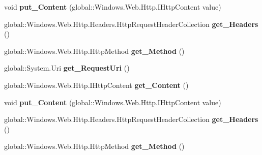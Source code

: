 \begin{DoxyCompactItemize}
void {\bfseries put\+\_\+\+Content} (global\+::\+Windows.\+Web.\+Http.\+I\+Http\+Content value)
\item 
\mbox{\label{interface_windows_1_1_web_1_1_http_1_1_i_http_request_message_a673256b5835bfd09b1edd689fb5333ad}} 
global\+::\+Windows.\+Web.\+Http.\+Headers.\+Http\+Request\+Header\+Collection {\bfseries get\+\_\+\+Headers} ()
\item 
\mbox{\label{interface_windows_1_1_web_1_1_http_1_1_i_http_request_message_a91a5d1f2da9e595f9d1b6c72e674d3dc}} 
global\+::\+Windows.\+Web.\+Http.\+Http\+Method {\bfseries get\+\_\+\+Method} ()
\item 
\mbox{\label{interface_windows_1_1_web_1_1_http_1_1_i_http_request_message_ace91874a34280b89ed6f4237fc3806df}} 
global\+::\+System.\+Uri {\bfseries get\+\_\+\+Request\+Uri} ()
\item 
\mbox{\label{interface_windows_1_1_web_1_1_http_1_1_i_http_request_message_a841ab70a054baf88551bb2a7b5d82d84}} 
global\+::\+Windows.\+Web.\+Http.\+I\+Http\+Content {\bfseries get\+\_\+\+Content} ()
\item 
\mbox{\label{interface_windows_1_1_web_1_1_http_1_1_i_http_request_message_a4bd07841801d3cdf596e41166635fe08}} 
void {\bfseries put\+\_\+\+Content} (global\+::\+Windows.\+Web.\+Http.\+I\+Http\+Content value)
\item 
\mbox{\label{interface_windows_1_1_web_1_1_http_1_1_i_http_request_message_a673256b5835bfd09b1edd689fb5333ad}} 
global\+::\+Windows.\+Web.\+Http.\+Headers.\+Http\+Request\+Header\+Collection {\bfseries get\+\_\+\+Headers} ()
\item 
\mbox{\label{interface_windows_1_1_web_1_1_http_1_1_i_http_request_message_a91a5d1f2da9e595f9d1b6c72e674d3dc}} 
global\+::\+Windows.\+Web.\+Http.\+Http\+Method {\bfseries get\+\_\+\+Method} ()

\end{DoxyCompactItemize}
